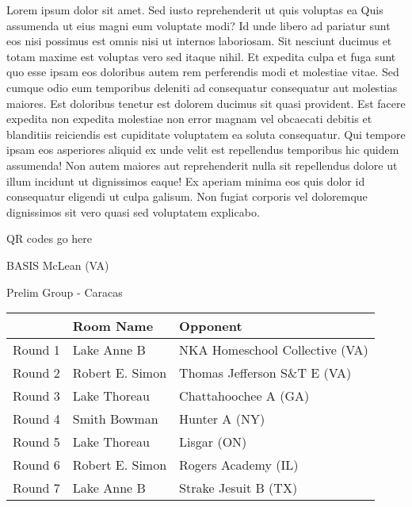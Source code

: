 \documentclass{article}%
\begin{document}
\vspace*{8pt}%
\linebreak%
\newline%
\newline%
Lorem ipsum dolor sit amet. Sed iusto reprehenderit ut quis voluptas ea Quis assumenda ut eius magni eum voluptate modi? Id unde libero ad pariatur sunt eos nisi possimus est omnis nisi ut internos laboriosam. Sit nesciunt ducimus et totam maxime est voluptas vero sed itaque nihil. Et expedita culpa et fuga sunt quo esse ipsam eos doloribus autem rem perferendis modi et molestiae vitae.\newline%
\newline%
Sed cumque odio eum temporibus deleniti ad consequatur consequatur aut molestias maiores. Est doloribus tenetur est dolorem ducimus sit quasi provident. Est facere expedita non expedita molestiae non error magnam vel obcaecati debitis et blanditiis reiciendis est cupiditate voluptatem ea soluta consequatur. Qui tempore ipsam eos asperiores aliquid ex unde velit est repellendus temporibus hic quidem assumenda!\newline%
\newline%
Non autem maiores aut reprehenderit nulla sit repellendus dolore ut illum incidunt ut dignissimos eaque! Ex aperiam minima eos quis dolor id consequatur eligendi ut culpa galisum. Non fugiat corporis vel doloremque dignissimos sit vero quasi sed voluptatem explicabo.\newline%
\newline%
%
\vspace*{30pt}%
\begin{center}%
\begin{Huge}%
QR codes go here%
\end{Huge}%
\end{center}%
\newpage%
%
\begin{center}%
\begin{Huge}%
BASIS McLean (VA)%
\end{Huge}%
\vspace*{8pt}%
\linebreak%
\begin{Large}%
Prelim Group {-} Caracas%
\end{Large}%
\end{center}%
\begin{tabularx}{\textwidth}{|c|Y|Y|}%
\hline%
&Room Name&Opponent\\%
\hline%
Round 1&Lake Anne B&NKA Homeschool Collective (VA)\\%
Round 2&Robert E. Simon&Thomas Jefferson S\&T E (VA)\\%
Round 3&Lake Thoreau&Chattahoochee A (GA)\\%
Round 4&Smith Bowman&Hunter A (NY)\\%
Round 5&Lake Thoreau&Lisgar (ON)\\%
Round 6&Robert E. Simon&Rogers Academy (IL)\\%
Round 7&Lake Anne B&Strake Jesuit B (TX)\\%
\hline%
\end{tabularx}%
\end{document}
